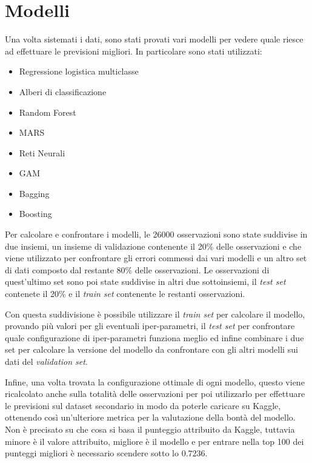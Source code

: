 
\section{Modelli}

Una volta sistemati i dati, sono stati provati vari modelli per vedere quale riesce ad effettuare le previsioni migliori.
In particolare sono stati utilizzati:

\begin{itemize}
	\item Regressione logistica multiclasse
	\item Alberi di classificazione
	\item Random Forest
	\item MARS
	\item Reti Neurali
	\item GAM
	\item Bagging
	\item Boosting
\end{itemize}

Per calcolare e confrontare i modelli, le 26000 osservazioni sono state suddivise in due insiemi, un insieme di validazione contenente il 20\% delle osservazioni e che viene utilizzato per confrontare gli errori commessi dai vari modelli e un altro set di dati composto dal restante 80\% delle osservazioni.
Le osservazioni di quest'ultimo set sono poi state suddivise in altri due sottoinsiemi, il \textit{test set} contenete il 20\% e il \textit{train set} contenente le restanti osservazioni. 

Con questa suddivisione è possibile utilizzare il \textit{train set} per calcolare il modello, provando più valori per gli eventuali iper-parametri, il \textit{test set} per confrontare quale configurazione di iper-parametri funziona meglio ed infine combinare i due set per calcolare la versione del modello da confrontare con gli altri modelli sui dati del \textit{validation set}.

Infine, una volta trovata la configurazione ottimale di ogni modello, questo viene ricalcolato anche sulla totalità delle osservazioni per poi utilizzarlo per effettuare le previsioni sul dataset secondario in modo da poterle caricare su Kaggle, ottenendo così un'ulteriore metrica per la valutazione della bontà del modello. Non è precisato su che cosa si basa il punteggio attribuito da Kaggle, tuttavia minore è il valore attribuito, migliore è il modello e per entrare nella top 100 dei punteggi migliori è necessario scendere sotto lo $0.7236$.

